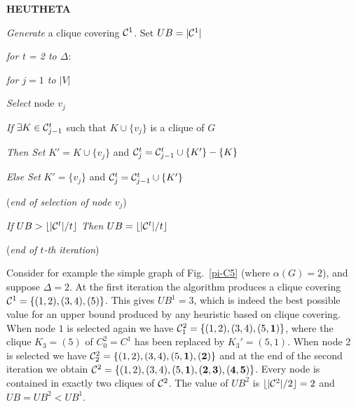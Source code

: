 \begin{description}
   \item{\bf HEUTHETA}    
   \begin{description}
     \item {\it Generate} a  clique covering ${\cal C}^1$.
           Set $UB = |{\cal C}^1|$   
     \item{\it for t = 2 to $\Delta$}: 
     \begin{description}
       \item {\it for $j=1$ to $|V|$} 
       \begin{description}  
          \item {\it Select} node $v_j$ 
          \item {\it If} $\exists K \in {\cal C}^t_{j-1}$ such that
                         $K \cup \{v_j\}$ is a clique of $G$
          \item  {\it Then Set} $K'=K \cup \{v_j\}$ and
               ${\cal C}^t_j = {\cal C}^t_{j-1} \cup \{K'\} - \{K\}$ 

          \item  {\it Else}  {\it Set} $K'=\{v_j\}$ and
               ${\cal C}^t_j = {\cal C}^t_{j-1} \cup \{K'\}$ 
       \end{description}
       \item ({\it end of selection of node $v_j$})
       \item  {\it If} $UB > \lfloor |{\cal C}^t|/t \rfloor$
              {\it Then} $UB = \lfloor |{\cal C}^t|/t \rfloor$
     \end{description}
    \item  ({\it end of $t$-th iteration}) 
   \end{description}
\end{description}


Consider for example the simple graph of  Fig.~\ref{pi-C5} (where $\alpha(G)
= 2$), and  suppose $\Delta = 2$. At the first iteration
 the algorithm produces a  clique
covering  ${\cal C}^1 = \{(1,2) , (3,4) , (5) \}$. This gives $UB^1
= 3$, which is indeed the best possible value for an upper bound
produced by any heuristic based on   clique covering.
When node $1$ is selected again we have  ${\cal
C}^2_1  = \{(1,2) , (3,4), (5,{\bf 1}) \}$, where the clique $K_3 =
(5)$ of $C^2_0=C^1$ has been replaced by $K_3'=(5,1)$.  When node
2 is selected we have ${\cal C}^2_2  = \{(1,2) , (3,4), (5,{\bf 1}) ,
({\bf 2}) \}$ and at the end of the second iteration we obtain  
${\cal C}^2  = \{(1,2) , (3,4), (5,{\bf 1}) , ({\bf 2,3}) , ({\bf
4,5}) \}$. Every node is contained in exactly
two cliques of ${\cal C}^2$. The value of $UB^2$ is $\lfloor |{\cal
C}^2|/2 \rfloor = 2$ and  $UB = UB^2 < UB^1$.  

